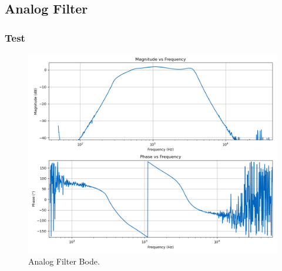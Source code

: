 \subsection{Analog Filter}

\subsubsection{Test}

\begin{figure}[H]
    \centering
    \includegraphics*[scale = 0.5]{Images/AnalogFilterScoppyBode.png}
    \caption{Analog Filter Bode.}
    \label{fig:AnalogFilterBodeScoppy}
\end{figure}
